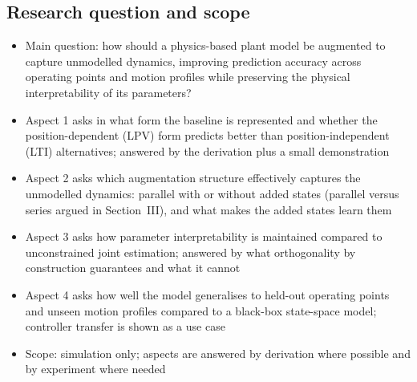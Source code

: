 \subsection{Research question and scope}
\begin{itemize}
\item Main question: how should a physics-based plant model be augmented to capture unmodelled dynamics, improving prediction accuracy across operating points and motion profiles while preserving the physical interpretability of its parameters?
\item Aspect 1 asks in what form the baseline is represented and whether the position-dependent (LPV) form predicts better than position-independent (LTI) alternatives; answered by the derivation plus a small demonstration
\item Aspect 2 asks which augmentation structure effectively captures the unmodelled dynamics: parallel with or without added states (parallel versus series argued in Section~III), and what makes the added states learn them
\item Aspect 3 asks how parameter interpretability is maintained compared to unconstrained joint estimation; answered by what orthogonality by construction guarantees and what it cannot
\item Aspect 4 asks how well the model generalises to held-out operating points and unseen motion profiles compared to a black-box state-space model; controller transfer is shown as a use case
\item Scope: simulation only; aspects are answered by derivation where possible and by experiment where needed
\end{itemize}

